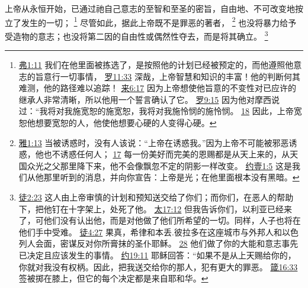 \documentclass[12pt, a4paper, oneside]{ctexart}
\newcounter{parnum}[section]
\newcommand{\N}{%
   \noindent\refstepcounter{parnum}%
    \makebox[\parindent][l]{\textbf{\arabic{parnum}.}}}
\begin{document}
\N 上帝从永恒开始，已通过祂自己意志的至智和至圣的密旨，自由地、不可改变地按立了发生的一切；
	\footnote {
		\href{https://biblehub.com/ephesians/1-11.htm}{弗1:11} 我们在他里面被拣选了，是按照他的计划已经被预定的，而他遵照他意志的旨意行一切事情，
		\href{https://biblehub.com/romans/11-33.htm}{罗11:33} 深哉，上帝智慧和知识的丰富！他的判断何其难测，他的路径难以追踪！
		\href{https://biblehub.com/hebrews/6-17.htm}{来6:17} 因为上帝想使他旨意的不变性对已应许的继承人非常清晰，所以他用一个誓言确认了它。
		\href{https://biblehub.com/romans/9-15.htm}{罗9:15} 因为他对摩西说过：“我将对我施宽恕的施宽恕，我将对我施怜悯的施怜悯。
		\href{https://biblehub.com/romans/9-18.htm}{18} 因此，上帝宽恕他想要宽恕的人，他使他想要心硬的人变得心硬。
	}
	尽管如此，据此上帝既不是罪恶的著者，
	\footnote {
		\href{https://biblehub.com/james/1-13.htm}{雅1:13} 当被诱惑时，没有人该说：“上帝在诱惑我。”因为上帝不可能被邪恶诱惑，他也不诱惑任何人；
		\href{https://biblehub.com/james/1-17.htm}{17} 每一份美好而完美的恩赐都是从天上来的，从天国众光之父那里降下来，他不会像飘忽不定的阴影一样改变。
		\href{https://biblehub.com/1_john/1-5.htm}{约壹1:5} 这是我们从他那里听到的消息，并向你宣告：上帝是光；在他里面根本没有黑暗。
	}
	也没将暴力给予受造物的意志；也没将第二因的自由性或偶然性夺去，而是将其确立。
	\footnote {
		\href{https://biblehub.com/acts/2-23.htm}{徒2:23} 这人由上帝审慎的计划和预知送交给了你们；而你们，在恶人的帮助下，把他钉在十字架上，处死了他。
		\href{https://biblehub.com/matthew/17-12.htm}{太17:12} 但我告诉你们，以利亚已经来了，可他们没有认出他，而是对他做了他们所希望的一切。同样，人子也将在他们手中受难。
		\href{https://biblehub.com/acts/4-27.htm}{徒4:27} 果真，希律和本丢.彼拉多在这座城市与外邦人和以色列人会面，密谋反对你所膏抹的圣仆耶稣。
		\href{https://biblehub.com/acts/4-28.htm}{28} 他们做了你的大能和意志事先已决定且应该发生的事情。
		\href{https://biblehub.com/john/19-11.htm}{约19:11} 耶稣回答：“如果不是从上天赐给你的，你就对我没有权柄。因此，把我送交给你的那人，犯有更大的罪恶。
		\href{https://biblehub.com/proverbs/16-33.htm}{箴16:33} 签被掷在膝上，但它的每个决定都是来自耶和华。
	}
\end{document}
